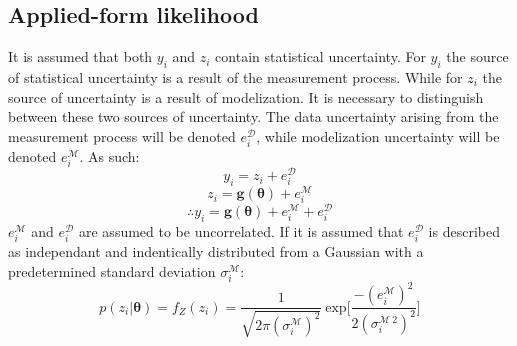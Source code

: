 \begin{tcolorbox}
\subsection{Applied-form likelihood}
It is assumed that both $y_i$ and $z_i$ contain statistical uncertainty. For $y_i$ the source of statistical uncertainty is a result of the measurement process. While for $z_i$ the source of uncertainty is a result of modelization. It is necessary to distinguish between these two sources of uncertainty. The data uncertainty arising from the measurement process will be denoted $e^{\mathcal{D}}_i$, while modelization uncertainty will be denoted $e^{\mathcal{M}}_i$. As such:
\begin{equation}
y_i = z_i + e^{\mathcal{D}}_i
\end{equation}
\begin{equation}
z_i = \bm{g}(\bm{\theta}) + e^{\mathcal{M}}_i
\end{equation}
\begin{equation}
\therefore y_i = \bm{g}(\bm{\theta}) + e^{\mathcal{M}}_i + e^{\mathcal{D}}_i
\end{equation}
$e^{\mathcal{M}}_i$ and $e^{\mathcal{D}}_i$ are assumed to be uncorrelated. If it is assumed that $e^{\mathcal{D}}_i$ is described as independant and indentically distributed from a Gaussian with a predetermined standard deviation $\sigma^{\mathcal{M}}_i$: 
\begin{equation}
p(z_i|\bm{\theta}) = f_Z(z_i) = \frac{1}{\sqrt{2\pi(\sigma^{\mathcal{M}}_i)^2}}\ \text{exp}\bigg[\frac{-(e^{\mathcal{M}}_i)^2}{2(\sigma^{\mathcal{M}\ 2}_i)^2} \bigg]
\end{equation} 

\end{tcolorbox}




